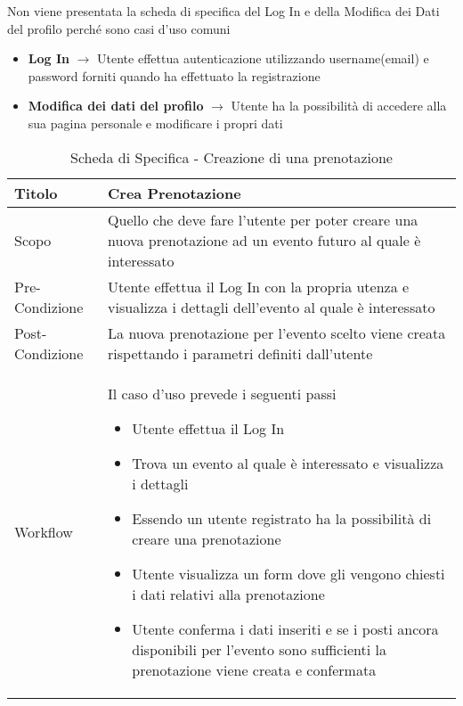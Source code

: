 Non viene presentata la scheda di specifica del Log In e della Modifica dei Dati del profilo perché sono casi d'uso comuni

\begin{itemize}
    \item \textbf{Log In} $\rightarrow$ Utente effettua autenticazione utilizzando username(email) e password forniti quando ha effettuato la registrazione
    \item \textbf{Modifica dei dati del profilo} $\rightarrow$ Utente ha la possibilità di accedere alla sua pagina personale e modificare i propri dati
\end{itemize}

\begin{table}[H]
    \begin{center}  
        \begin{tabular}{ | l | p{13cm} |} %
        \hline
        \textbf{Titolo} & \textbf{Crea Prenotazione}\\ \hline  
           
        Scopo & Quello che deve fare l'utente per poter creare una nuova prenotazione ad un evento futuro al quale è interessato\\ \hline  
           
        Pre-Condizione & Utente effettua il Log In con la propria utenza e visualizza i dettagli dell'evento al quale è interessato\\ \hline  
           
        Post-Condizione & La nuova prenotazione per l'evento scelto viene creata rispettando i parametri definiti dall'utente\\ \hline  
           
        Workflow & Il caso d'uso prevede i seguenti passi
        \begin{itemize}
            \item Utente effettua il Log In
            \item Trova un evento al quale è interessato e visualizza i dettagli
            \item Essendo un utente registrato ha la possibilità di creare una prenotazione
            \item Utente visualizza un form dove gli vengono chiesti i dati relativi alla prenotazione
            \item Utente conferma i dati inseriti e se i posti ancora disponibili per l'evento sono sufficienti la prenotazione viene creata e confermata
        \end{itemize}\\ \hline  
           
        \end{tabular}  
        \caption{Scheda di Specifica - Creazione di una prenotazione}
    \end{center}  
\end{table}

